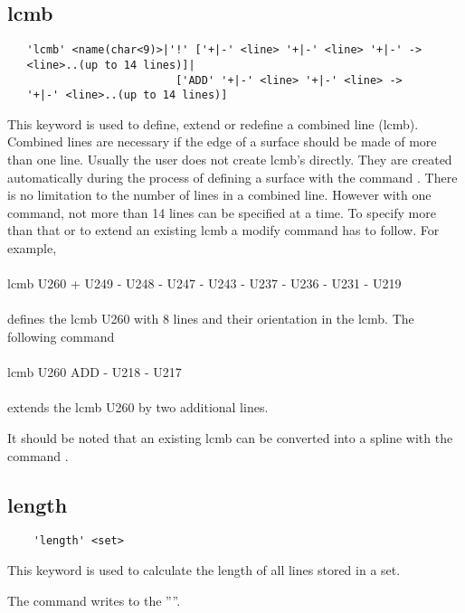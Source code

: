 \documentclass{article}
\begin{document}
\subsection{\label{lcmb}lcmb}
\begin{verbatim}
   'lcmb' <name(char<9)>|'!' ['+|-' <line> '+|-' <line> '+|-' ->
   <line>..(up to 14 lines)]|
                          ['ADD' '+|-' <line> '+|-' <line> ->
   '+|-' <line>..(up to 14 lines)]
\end{verbatim}
This keyword is used to define, extend or redefine a combined line (lcmb). Combined lines are necessary if the edge of a surface should be made of more than one line. Usually the user does not create lcmb's directly. They are created automatically during the process of defining a surface with the command . There is no limitation to the number of lines in a combined line. However with one command, not more than 14 lines can be specified at a time. To specify more than that or to extend an existing lcmb a modify command has to follow. For example,\\\\lcmb U260 + U249 - U248 - U247 - U243 - U237 - U236 - U231 - U219 \\\\defines the lcmb U260 with 8 lines and their orientation in the lcmb. The following command\\\\lcmb U260 ADD - U218 - U217\\\\extends the lcmb U260 by two additional lines.

It should be noted that an existing lcmb can be converted into a spline with the command . 

\subsection{\label{length}length}
\begin{verbatim}
    'length' <set>
\end{verbatim}
This keyword is used to calculate the length of all lines stored in a set.

The command writes to the ''''.
\end{document}
